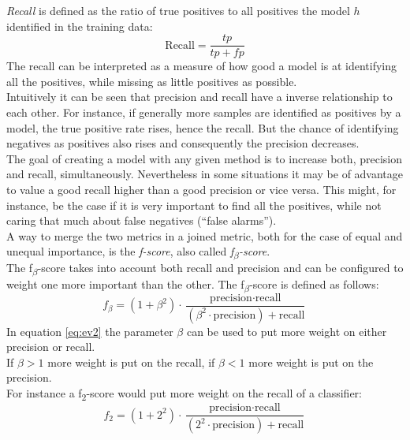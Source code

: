 \emph{Recall} is defined as the ratio of true positives to all positives the model $h$ identified in the training data:
\begin{equation} \label{eq:ev1}
\text{Recall}=\frac{tp}{tp+fp}
\end{equation}
The recall can be interpreted as a measure of how good a model is at identifying all the positives, while missing as little positives as possible.
\\

Intuitively it can be seen that precision and recall have a inverse relationship to each other. For instance, if generally more samples are identified as positives by a model, the true positive rate rises, hence the recall. But the chance of identifying negatives as positives also rises and consequently the precision decreases.
\\
The goal of creating a model with any given method is to increase both, precision and recall, simultaneously. Nevertheless in some situations it may be of advantage to value a good recall higher than a good precision or vice versa. This might, for instance, be the case if it is very important to find all the positives, while not caring that much about false negatives (``false alarms'').
\\

A way to merge the two metrics in a joined metric, both for the case of equal and  unequal importance, is the \emph{f-score}, also called \emph{f\textsubscript{$\beta$}-score}.
\\
The f\textsubscript{$\beta$}-score takes into account both recall and precision and can be configured to weight one more important than the other. The f\textsubscript{$\beta$}-score is defined as follows:
\begin{equation} \label{eq:ev2}
f_\beta = (1+\beta^2) \cdot \frac{\text{precision} \cdot \text{recall}}{(\beta^2 \cdot \text{precision}) + \text{recall}}
\end{equation}
In equation \ref{eq:ev2} the parameter $\beta$ can be used to put more weight on either precision or recall. 
\\
If  $\beta>1$ more weight is put on the recall,  if  $\beta<1$ more weight is put on the precision.
\\
For instance a f\textsubscript{2}-score  would put more weight on the recall of a classifier:
\begin{equation} \label{eq:ev3}
f_2 = (1+2^2) \cdot \frac{\text{precision} \cdot \text{recall}}{(2^2 \cdot \text{precision}) + \text{recall}}
\end{equation}	

